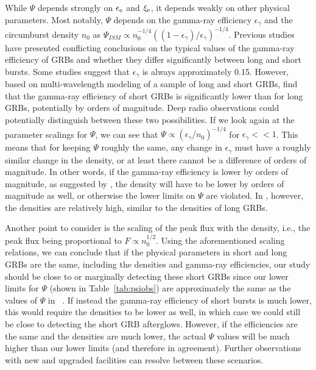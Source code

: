 \documentclass[12pt]{article}
\begin{document}
While $\Psi$ depends strongly on $\epsilon_{\rm{e}}$ and $\xi_{\rm{e}}$, it depends weakly on other physical parameters. Most notably, $\Psi$ depends on the gamma-ray efficiency $\epsilon_{\gamma}$ and the circumburst density $n_0$ as $\Psi_{ISM}\propto n_0^{-1/4} ((1-\epsilon_{\gamma})/\epsilon_{\gamma})^{-1/4}$. 
Previous studies have presented conflicting conclusions on the typical values of the gamma-ray efficiency of GRBs and whether they differ significantly between long and short bursts. Some studies \citep{10.1111/j.1365-2966.2006.10280.x,10.1093/mnras/stv2033,10.1093/mnras/stw1331} suggest that $\epsilon_{\gamma}$ is always approximately 0.15. However, based on multi-wavelength modeling of a sample of long and short GRBs, \citet{2022MNRAS.511.2848A} find that the gamma-ray efficiency of short GRBs is significantly lower than for long GRBs, potentially by orders of magnitude. Deep radio observations could potentially distinguish between these two possibilities. If we look again at the parameter scalings for $\Psi$, we can see that $\Psi\propto (\epsilon_{\gamma}/n_0)^{-1/4}$ for $\epsilon_{\gamma} << 1$. This means that for keeping $\Psi$ roughly the same, any change in $\epsilon_{\gamma}$ must have a roughly similar change in the density, or at least there cannot be a difference of orders of magnitude. In other words, if the gamma-ray efficiency is lower by orders of magnitude, as suggested by \citet{2022MNRAS.511.2848A}, the density will have to be lower by orders of magnitude as well, or otherwise the lower limits on $\Psi$ are violated. In \citet{2022MNRAS.511.2848A}, however, the densities are relatively high, similar to the densities of long GRBs.

Another point to consider is the scaling of the peak flux with the density, i.e., the peak flux being proportional to $F\propto n_0^{1/2}$. Using the aforementioned scaling relations, we can conclude that if the physical parameters in short and long GRBs are the same, including the densities and gamma-ray efficiencies, our study should be close to or marginally detecting these short GRBs since our lower limits for $\Psi$ (shown in Table~\ref{tab:psiobs}) are approximately the same as the values of $\Psi$ in ~\citet{2023MNRAS.518.1522D}. If instead the gamma-ray efficiency of short bursts is much lower, this would require the densities to be lower as well, in which case we could still be close to detecting the short GRB afterglows. However, if the efficiencies are the same and the densities are much lower, the actual $\Psi$ values will be much higher than our lower limits (and therefore in agreement). Further observations with new and upgraded facilities can resolve between these scenarios. 
\end{document}
